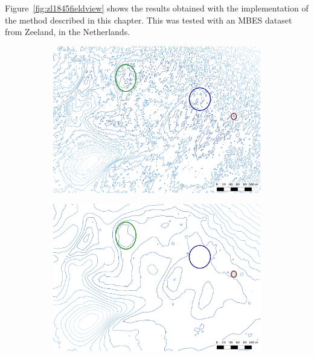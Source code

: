 Figure~\ref{fig:zl1845fieldview} shows the results obtained with the implementation of the method described in this chapter.
This was tested with an MBES dataset from Zeeland, in the Netherlands.
\begin{figure}
\centering
  \begin{subfigure}[b]{0.55\linewidth}
    \centering
    \includegraphics[width=\textwidth]{figs/zl1845fieldview_o.pdf}
    \caption{}\label{fig:zl1845fieldview_o}
  \end{subfigure}
  \quad
  \begin{subfigure}[b]{0.55\linewidth}
    \centering
    \includegraphics[width=\textwidth]{figs/zl1845fieldview_s.pdf}
    \caption{}\label{fig:zl1845fieldview_s}
  \end{subfigure}
  \quad
  \begin{subfigure}[b]{0.55\linewidth}

\end{subfigure}
\end{figure}
